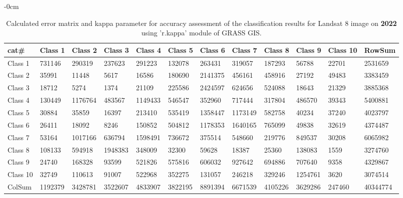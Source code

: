 \documentclass[sustainability,article,submit,pdftex,moreauthors]{Definitions/mdpi}
\begin{document}
\begin{table}[H] 
\footnotesize
    \centering
    \begin{adjustwidth}{-\extralength}{0cm}
    \caption{Calculated error matrix and kappa parameter for accuracy assessment of the classification results for Landsat 8 image on \textbf{2022} using 'r.kappa' module of GRASS GIS.\label{tab03}}
 	\begin{tabularx}{\fulllength}{|l|l|l|l|l|l|l|l|l|l|l|l|}
    \toprule
         \textbf{cat\#} & \textbf{Class 1} & \textbf{Class 2} & \textbf{Class 3} & \textbf{Class 4} & \textbf{Class 5} & \textbf{Class 6} & \textbf{Class 7} & \textbf{Class 8} & \textbf{Class 9} & \textbf{Class 10} & \textbf{RowSum} \\ \hline
        Class 1 & \cellcolor{green!20}731146 & 290319 & 237623 & 291223 & 132078 & 263431 & 319057 & 187293 & 56788 & 22701 & 2531659 \\ \hline
        Class 2 & 35991 & \cellcolor{green!20}11448 & 5617 & 16586 & 180690 & 2141375 & 456161 & 458916 & 27192 & 49483 & 3383459 \\ \hline
        Class 3 & 18712 & 5274 & \cellcolor{green!20}1374 & 21109 & 225586 & 2424597 & 624656 & 524088 & 18643 & 21329 & 3885368 \\ \hline
        Class 4 & 130449 & 1176764 & 483567 & \cellcolor{green!20}1149433 & 546547 & 352960 & 717444 & 317804 & 486570 & 39343 & 5400881 \\ \hline
        Class 5 & 30884 & 35859 & 16397 & 213410 & \cellcolor{green!20}535419 & 1358447 & 1173149 & 582758 & 40234 & 37240 & 4023797 \\ \hline
        Class 6 & 26411 & 18092 & 8246 & 150852 & 504812 & \cellcolor{green!20}1178353 & 1640165 & 765099 & 49838 & 32619 & 4374487 \\ \hline
        Class 7 & 53164 & 1017166 & 636794 & 1598491 & 736672 & 375514 & \cellcolor{green!20}548660 & 219776 & 849537 & 30208 & 6065982 \\ \hline
        Class 8 & 108133 & 594918 & 1948383 & 348009 & 32300 & 59628 & 18387 & \cellcolor{green!20}25360 & 138083 & 1559 & 3274760 \\ \hline
        Class 9 & 24740 & 168328 & 93599 & 521826 & 575816 & 606032 & 927642 & 694886 & \cellcolor{green!20}707640 & 9358 & 4329867 \\ \hline
        Class 10 & 32749 & 110613 & 91007 & 522968 & 352275 & 131057 & 246218 & 329246 & 1254761 & \cellcolor{green!20}3620 & 3074514 \\ \hline
        ColSum & 1192379 & 3428781 & 3522607 & 4833907 & 3822195 & 8891394 & 6671539 & 4105226 & 3629286 & 247460 & \cellcolor{green!20}40344774 \\ \hline
     \bottomrule
    \end{tabularx}
    \end{adjustwidth}
\end{table}
\end{document}
